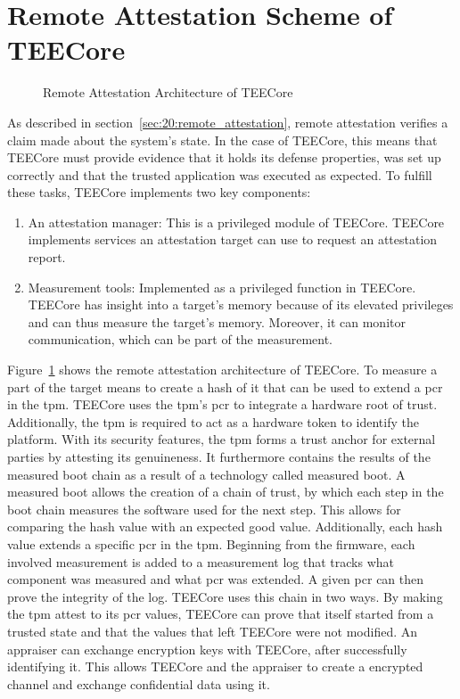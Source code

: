 \section{Remote Attestation Scheme of TEECore}
\label{sec:30:tee_ra_scheme}
\begin{figure}
  \begin{center}
    
    \caption{Remote Attestation Architecture of TEECore}
    \label{fig:30:tee_ra}
  \end{center}
\end{figure}
As described in section~\ref{sec:20:remote_attestation}, remote attestation
verifies a claim made about the system's state. In the case of TEECore, this
means that TEECore must provide evidence that it holds its defense properties,
was set up correctly and that the trusted application was executed as expected.
To fulfill these tasks, TEECore implements two key components:
\begin{enumerate}
  \item An attestation manager: This is a privileged module of
    TEECore. TEECore implements services an attestation target can use to
    request an attestation report.
  \item Measurement tools: Implemented as a privileged function in TEECore.
    TEECore has insight into a target's memory because of its elevated
    privileges and can thus measure the target's memory. Moreover, it can
    monitor communication, which can be part of the measurement.
\end{enumerate}

Figure~\ref{fig:30:tee_ra} shows the remote attestation architecture of TEECore.
To measure a part of the target means to create a hash of it that can be used to
extend a \gls{pcr} in the \gls{tpm}. TEECore uses the \gls{tpm}'s \gls{pcr} to
integrate a hardware root of trust. Additionally, the \gls{tpm} is required to
act as a hardware token to identify the platform. With its security features,
the \gls{tpm} forms a trust anchor for external parties by attesting its
genuineness. It furthermore contains the results of the measured boot chain as a
result of a technology called measured boot. A measured boot allows the creation
of a chain of trust, by which each step in the boot chain measures the software
used for the next step. This allows for comparing the hash value with an
expected good value. Additionally, each hash value extends a specific \gls{pcr}
in the \gls{tpm}. Beginning from the firmware, each involved measurement is
added to a measurement log that tracks what component was measured and what
\gls{pcr} was extended. A given \gls{pcr} can then prove the integrity of the
log. TEECore uses this chain in two ways. By making the \gls{tpm} attest to its
\gls{pcr} values, TEECore can prove that itself started from a trusted state and
that the values that left TEECore were not modified. An appraiser can exchange
encryption keys with TEECore, after successfully identifying it. This allows
TEECore and the appraiser to create a encrypted channel and exchange
confidential data using it.\\

